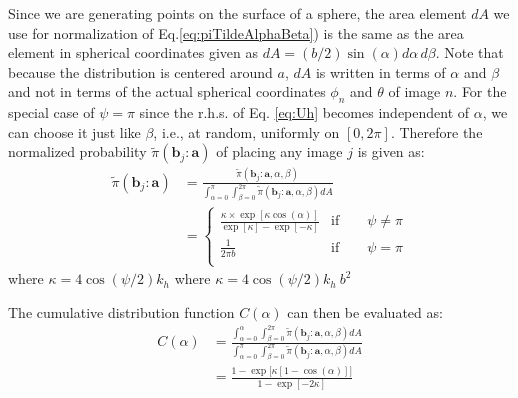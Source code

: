     Since we are generating points on the surface of a sphere, the area element $dA$ we use for normalization of Eq.\eqref{eq:piTildeAlphaBeta}) is the same as the area element in spherical coordinates given as $dA = (b/2) \sin(\alpha) d\alpha \, d\beta$. Note that because the distribution is centered around $a$, $dA$ is written in terms of $\alpha$ and $\beta$ and not in terms of the actual spherical coordinates $\phi_n$ and $\theta$ of image $n$. For the special case of $\psi = \pi$ since the r.h.s. of Eq. \eqref{eq:Uh} becomes independent of $\alpha$, we can choose it just like $\beta$, i.e., at random, uniformly on $[0, 2\pi]$. Therefore the normalized probability $\tilde \pi({\mathbf b}_j: {\mathbf a}) $ of placing any image $j$ is given as:
    \begin{equation}
    \label{eq:piTildebj}
        \begin{aligned}
            \tilde \pi({\mathbf b}_j: {\mathbf a}) &= \frac{\tilde \pi({\mathbf b}_j: {\mathbf a}, \alpha, \beta) }{\displaystyle\int_{\alpha = 0}^\pi \int_{\beta = 0}^{2 \pi} \tilde \pi({\mathbf b}_j: {\mathbf a}, \alpha, \beta) dA}\\
            &=
            \begin{cases}
                \displaystyle\frac{\kappa \times \exp[\kappa \cos (\alpha)]}{\exp[\kappa] - \exp[-\kappa]} & \text{if} \qquad \psi \ne \pi\\
                \displaystyle\frac{1}{2 \pi b} & \text{if} \qquad \psi = \pi\\
            \end{cases}
        \end{aligned}
    \end{equation}
    \ifkhExplicitP
        where $\kappa = 4 \cos(\psi/2) k_h$
    \else
        where $\kappa = 4 \cos(\psi/2) k_h~b^2$
    \fi

    The cumulative distribution function $C(\alpha)$ can then be evaluated as:
    \begin{equation}
    \label{eq:cdf}
        \begin{aligned}
            C(\alpha) &= \frac{\displaystyle\int_{\alpha = 0}^\alpha \int_{\beta = 0}^{2 \pi} \tilde \pi({\mathbf b}_j: {\mathbf a}, \alpha, \beta) dA}{\displaystyle\int_{\alpha = 0}^\pi \int_{\beta = 0}^{2 \pi} \tilde \pi({\mathbf b}_j: {\mathbf a}, \alpha, \beta) dA}\\
            &= \displaystyle\frac{1 - \exp \big[\kappa [1 - \cos (\alpha)] \big]}{1 - \exp [-2 \kappa]}
        \end{aligned}
    \end{equation}
